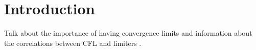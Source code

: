 
\section{Introduction}

Talk about the importance of having convergence limits and information about the correlations between CFL and limiters .
